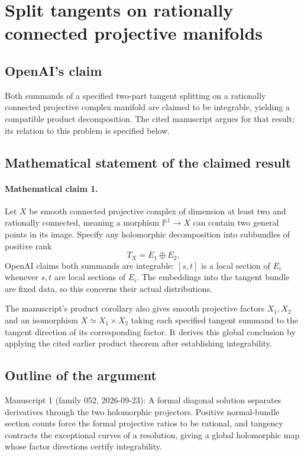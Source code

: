 \documentclass[11pt]{article}
\begin{document}
\section*{Split tangents on rationally connected projective manifolds}

\subsection{OpenAI's claim}
Both summands of a specified two-part tangent splitting on a rationally connected projective complex manifold are claimed to be integrable, yielding a compatible product decomposition. The cited manuscript argues for that result; its relation to this problem is specified below.

\subsection{Mathematical statement of the claimed result}
\paragraph{Mathematical claim 1.} Let $X$ be smooth connected projective complex of dimension at least two and rationally connected, meaning a morphism $\mathbb P^1\to X$ can contain two general points in its image. Specify any holomorphic decomposition into subbundles of positive rank
\[
T_X=E_1\oplus E_2,
\]
OpenAI claims both summands are integrable: $[s,t]$ is a local section of $E_i$ whenever $s,t$ are local sections of $E_i$. The embeddings into the tangent bundle are fixed data, so this concerns their actual distributions.

The manuscript's product corollary also gives smooth projective factors $X_1,X_2$ and an isomorphism $X\simeq X_1\times X_2$ taking each specified tangent summand to the tangent direction of its corresponding factor. It derives this global conclusion by applying the cited earlier product theorem after establishing integrability.

\subsection{Outline of the argument}
Manuscript 1 (family 052, 2026-09-23): A formal diagonal solution separates derivatives through the two holomorphic projectors. Positive normal-bundle section counts force the formal projective ratios to be rational, and tangency contracts the exceptional curves of a resolution, giving a global holomorphic map whose factor directions certify integrability.
\end{document}
